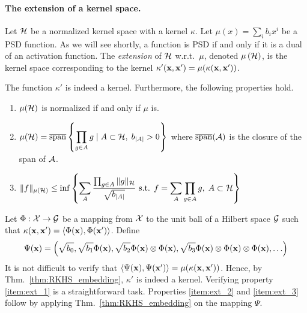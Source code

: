 \paragraph{The extension of a kernel space.} Let ${\cal H}$ be a normalized kernel
space with a kernel $\kappa$. Let $\mu(x)=\sum_{i} b_i x^i$ be a
PSD function. 
As we will see shortly, a function is PSD if and only if it is a
dual of an activation function.
The {\em extension} of ${\cal H}$ w.r.t.\ $\mu$, denoted
$\mu\left({\cal H}\right)$, is the kernel space corresponding to the kernel
$\kappa'({\mathbf x},{\mathbf x}')=\mu(\kappa({\mathbf x},{\mathbf x}'))$.
\begin{lemma}\label{lem:extension}
The function $\kappa'$ is indeed a kernel. Furthermore, the following
properties hold.
\begin{enumerate}
\item \label{item:ext_1}
  $\mu({\cal H})$ is normalized if and only if $\mu$ is.
\item \label{item:ext_2}
  $\mu({\cal H}) = \overline{\mathrm{span}}
    \left\{\displaystyle \prod_{g\in A}g\mid A\subset {\cal H},\; b_{|A|}>0 \right\}$
		where $\overline{\mathrm{span}}({\cal A})$ is the closure of the
		span of ${\cal A}$.
\item \label{item:ext_3}
  $\|f\|_{\mu({\cal H})}\le\inf \left\{\displaystyle
    \sum_{A}\frac{\prod_{g\in A}\|g\|_{{\cal H}}}{\sqrt{b_{|A|}}}
    \mbox{ s.t. } f=\sum_{A}\prod_{g\in A}g,\;A\subset{\cal H}\right\}$
\end{enumerate}
\end{lemma}
Let $\Phi:{\cal X} \to {\cal G}$ be a mapping from ${\cal X}$ to the unit ball of a Hilbert
space ${\cal G}$ such that $\kappa({\mathbf x},{\mathbf x}')=\langle \Phi({\mathbf x}),\Phi({\mathbf x}') \rangle$. Define
\[
\Psi({\mathbf x})=\left(\sqrt{b_0},\sqrt{b_1}\Phi({\mathbf x}),\sqrt{b_2}\Phi({\mathbf x})\otimes \Phi({\mathbf x}), \sqrt{b_3}\Phi({\mathbf x})\otimes \Phi({\mathbf x})\otimes \Phi({\mathbf x}),\ldots \right)
\]
It is not difficult to verify that
$\langle \Psi({\mathbf x}),\Psi({\mathbf x}') \rangle=\mu(\kappa({\mathbf x},{\mathbf x}'))$. Hence, by
Thm.~\ref{thm:RKHS_embedding}, $\kappa'$ is indeed a kernel. Verifying
property \ref{item:ext_1} is a straightforward task. Properties
\ref{item:ext_2} and \ref{item:ext_3} follow by applying
Thm.~\ref{thm:RKHS_embedding} on the mapping $\Psi$. \proofbox

